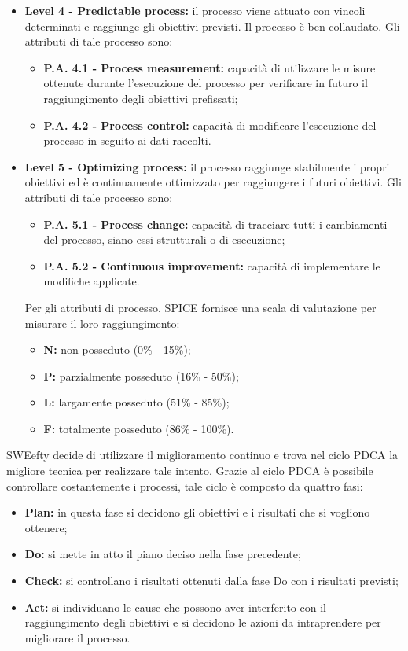 \begin{itemize}
\begin{itemize}
		\end{itemize}
	\item \textbf{Level 4 - Predictable process:}
		il processo viene attuato con vincoli determinati  e  raggiunge  gli  obiettivi  previsti. Il processo è ben collaudato. Gli attributi di tale processo sono:
		\begin{itemize}
			\item \textbf{P.A. 4.1 - Process measurement:}
			capacità  di  utilizzare  le  misure ottenute durante l’esecuzione del processo per verificare in futuro il raggiungimento degli obiettivi prefissati;
			\item \textbf{P.A. 4.2 - Process control:}
			capacità  di  modificare  l’esecuzione  del processo in seguito ai dati raccolti.
		\end{itemize}
	\item \textbf{Level 5 - Optimizing process:}
		il processo raggiunge stabilmente i propri obiettivi ed è continuamente ottimizzato per raggiungere i futuri obiettivi.
		Gli attributi di tale processo sono:
		\begin{itemize}
			\item \textbf{P.A. 5.1 - Process change:}
			capacità di tracciare tutti i cambiamenti del processo, siano essi strutturali o di esecuzione;
			\item \textbf{P.A. 5.2 - Continuous improvement:}
			capacità di implementare le modifiche applicate.
		\end{itemize}

		Per gli attributi di processo, SPICE fornisce una scala di valutazione per misurare il loro raggiungimento:
		\begin{itemize}
			\item \textbf{N:} non posseduto (0\% - 15\%);
			\item \textbf{P:} parzialmente posseduto (16\% - 50\%);
			\item \textbf{L:} largamente posseduto (51\% - 85\%);
			\item \textbf{F:} totalmente posseduto (86\% - 100\%).
		\end{itemize}
\end{itemize}
	SWEefty decide di utilizzare il miglioramento continuo e trova nel ciclo PDCA la migliore tecnica per realizzare tale intento.
	Grazie al ciclo PDCA è possibile controllare costantemente i processi, tale ciclo è composto da quattro fasi:
	\begin{itemize}
		\item \textbf{Plan:} in questa fase si decidono gli obiettivi e i risultati che si vogliono ottenere;
		\item \textbf{Do:} si mette in atto il piano deciso nella fase precedente;	
		\item \textbf{Check:} si controllano i risultati ottenuti dalla fase Do con i risultati previsti;
		\item \textbf{Act:} si individuano le cause che possono aver interferito con il raggiungimento degli obiettivi e si decidono le azioni da intraprendere per migliorare il processo.
	\end{itemize}

